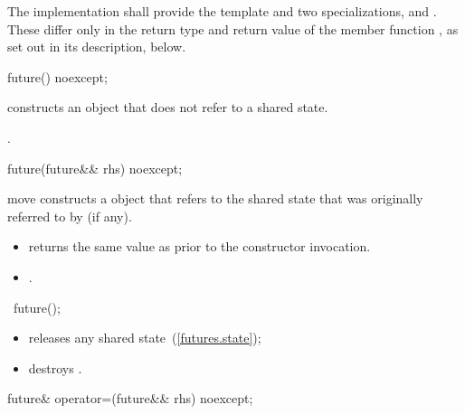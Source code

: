 \pnum
The implementation shall provide the template  and two specializations,
 and . These differ only in the return type and return
value of the member function , as set out in its description, below.

%
\begin{itemdecl}
future() noexcept;
\end{itemdecl}

\begin{itemdescr}
\pnum
\effects constructs an 
 object that does not refer to a
shared state.

\pnum
\postcondition {}.
\end{itemdescr}

%
\begin{itemdecl}
future(future&& rhs) noexcept;
\end{itemdecl}

\begin{itemdescr}
\pnum
\effects move constructs a  object that refers to the shared
state that
was originally referred to by  (if any).

\pnum
\postconditions
\begin{itemize}
\item {} returns the same value as  prior to the
constructor invocation.
\item {}.
\end{itemize}
\end{itemdescr}

%
\begin{itemdecl}
~future();
\end{itemdecl}

\begin{itemdescr}
\pnum
\effects
\begin{itemize}
\item
releases any shared state~(\ref{futures.state});

\item
destroys .
\end{itemize}
\end{itemdescr}

%
%
\begin{itemdecl}
future& operator=(future&& rhs) noexcept;
\end{itemdecl}

